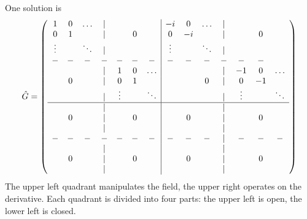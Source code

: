 One solution is
\begin{equation}
\hat{G} = 
\left( \begin{array}{ccccccc|ccccccc}
  1    &   0   & \ldots & | &        &        &        &    -i  &  0  & \ldots & | &        &    &        \\
  0    &   1   &        & | &        &   0    &        &     0  & -i  &        & | &        &  0 &        \\
\vdots &       & \ddots & | &        &        &        & \vdots &     & \ddots & | &        &    &        \\ 
  -    &   -   &   -    & - &   -    &   -    &   -    &    -   &  -  &   -    & - &   -    & -  &        \\
       &       &        & | &    1   &   0    & \ldots &        &     &        & | &   -1   &  0 & \ldots \\
       &   0   &        & | &    0   &   1    &        &        &     &   0    & | &   0    & -1 &        \\
       &       &        & | & \vdots &        & \ddots &        &     &        & | & \vdots &    & \ddots \\
\hline
       &       &        & | &        &        &        &        &     &        & | &        &    &        \\
       &   0   &        & | &        &   0    &        &        &  0  &        & | &        &  0 &        \\
       &       &        & | &        &        &        &        &     &        & | &        &    &        \\
  -    &   -   &   -    & - &    -   &    -   &   -    &   -    &  -  &  -     & | &   -    & -  &   -    \\
       &       &        & | &        &        &        &        &     &        & | &        &    &        \\
       &   0   &        & | &        &   0    &        &        &  0  &        & | &        &  0 &        \\
       &       &        & | &        &        &        &        &     &        & | &        &    &        \\
\end{array} \right)
\label{Gmatrix}
\end{equation}
The upper left quadrant manipulates the field, the upper right operates on the derivative. Each quadrant is divided into four parts: the upper left is open, the lower left is closed.

